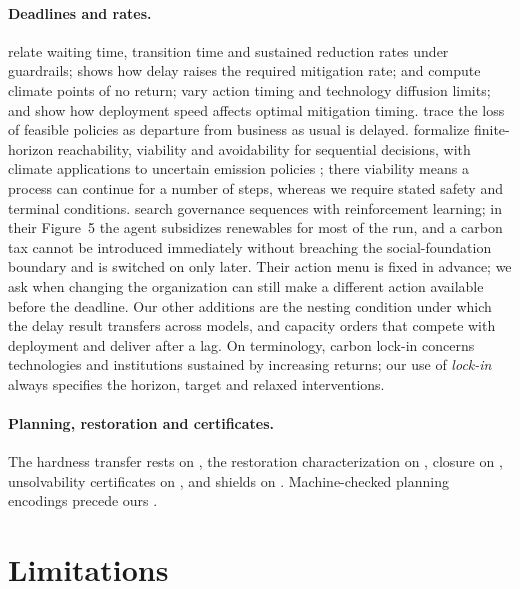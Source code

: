 \documentclass[11pt]{article}
\theoremstyle{plain}
\theoremstyle{definition}
\begin{document}
\paragraph{Deadlines and rates.} \citet[Section~4 and Figure~4]{PetschelHeldEtAl1999} relate waiting time, transition time and sustained reduction rates under guardrails; \citet{Stocker2013} shows how delay raises the required mitigation rate; \citet{vanZalingeEtAl2017} and \citet[Sections~2--3]{AengenheysterEtAl2018} compute climate points of no return; \citet{IyerEtAl2015} vary action timing and technology diffusion limits; and \citet{VogtSchilbHallegatte2014} show how deployment speed affects optimal mitigation timing. \citet{MathiasEtAl2017} trace the loss of feasible policies as departure from business as usual is delayed. \citet{BottaEtAl2017} formalize finite-horizon reachability, viability and avoidability for sequential decisions, with climate applications to uncertain emission policies \citep{BottaEtAl2018}; there viability means a process can continue for a number of steps, whereas we require stated safety and terminal conditions. \citet{StrnadEtAl2019} search governance sequences with reinforcement learning; in their Figure~5 the agent subsidizes renewables for most of the run, and a carbon tax cannot be introduced immediately without breaching the social-foundation boundary and is switched on only later. Their action menu is fixed in advance; we ask when changing the organization can still make a different action available before the deadline. Our other additions are the nesting condition under which the delay result transfers across models, and capacity orders that compete with deployment and deliver after a lag. On terminology, carbon lock-in \citep{Unruh2000} concerns technologies and institutions sustained by increasing returns; our use of \emph{lock-in} always specifies the horizon, target and relaxed interventions.

\paragraph{Planning, restoration and certificates.} The hardness transfer rests on \citet{Bylander1994}, the restoration characterization on \citet{FeigeKogan2021}, closure on \citet{DowlingGallier1984}, unsolvability certificates on \citet{ErikssonEtAl2017}, and shields on \citet{AlshiekhEtAl2018}. Machine-checked planning encodings precede ours \citep{AbdulazizKurz2023}.

\section{Limitations}
\label{sec:limits}
\end{document}
